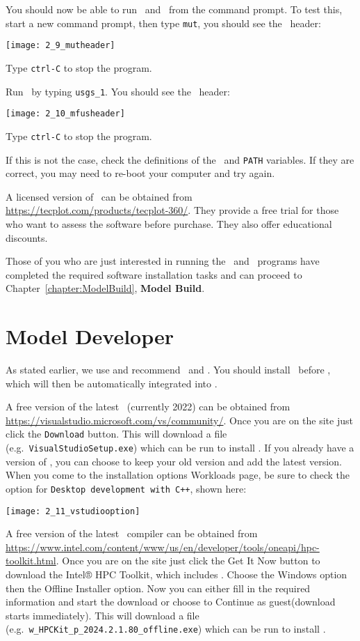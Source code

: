 You should now be able to run \mut\ and \mfus\ from the command prompt.  To test this, start a new command prompt, then type \texttt{mut}, you should see the \mut\ header:

    \texttt{[image: 2\_9\_mutheader]}

Type \texttt{ctrl-C} to stop the program.

Run \mfus\ by typing \texttt{usgs\_1}.  You should see the \mfus\ header:

    \texttt{[image: 2\_10\_mfusheader]}

Type \texttt{ctrl-C} to stop the program.

If this is not the case, check the definitions of the \bin\ and {\tt PATH} variables.  If they are correct, you may need to re-boot your computer and try again.

A licensed version of \tecplot\ can be obtained from \url{https://tecplot.com/products/tecplot-360/}.  They provide a free trial for those who want to assess the software before purchase.  They also offer educational discounts.

Those of you who are just interested in running the \mut\ and \mfus\ programs have completed the required  software installation tasks and can proceed to Chapter~\ref{chapter:ModelBuild}, \textbf{Model Build}.


\section{Model Developer}
As stated earlier, we use and recommend \vstudio\ and \ifort. You should install \vstudio\ before \ifort, which will then be automatically integrated into \vstudio.

A free version of the latest \vstudio\ (currently 2022) can be obtained from \url{https://visualstudio.microsoft.com/vs/community/}. Once you are on the site just click the \texttt{Download} button.  This will download a file (e.g.\ \texttt{VisualStudioSetup.exe}) which can be run to install \vstudio.  If you already have a version of \vstudio, you can choose to keep your old version and add the latest version.  When you come to the installation options {\sf Workloads} page, be sure to check the option for \texttt{Desktop development with C++}, shown here:

\texttt{[image: 2\_11\_vstudiooption]}

A free version of the latest \ifort\ compiler can be obtained from \url{https://www.intel.com/content/www/us/en/developer/tools/oneapi/hpc-toolkit.html}.
Once you are on the site just click the {\sf Get It Now} button to download the Intel® HPC Toolkit, which includes \ifort.  Choose the {\sf Windows} option then the {\sf Offline Installer} option. Now you can either fill in the required information and start the download or choose to {\sf Continue as guest(download starts immediately)}.  This will download a file (e.g.\ \texttt{w\_HPCKit\_p\_2024.2.1.80\_offline.exe}) which can be run to install \ifort.


